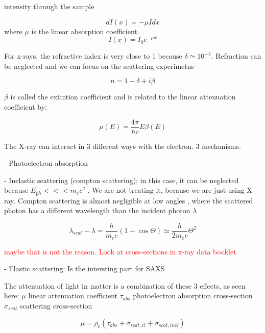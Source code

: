 intensity through the sample

\begin{equation}
        dI\left( x \right)=-\mu I dx
\end{equation}
where $\mu$ is the linear absorption coefficient.
\begin{equation}
        I\left( x \right)=I_0e^{-\mu x}
\end{equation}

For x-rays, the refractive index is very close to 1 because $\delta\simeq10^{-5}$. Refraction can be neglected and we can focus on the scattering experimetns

\begin{equation}
        n = 1 - \delta +i \beta
\end{equation}

$\beta$ is called the extintion coefficient and is related to the linear attenuation coefficient by:

\begin{equation}
        \mu (E) = \frac{4\pi}{hc} E \beta(E)
\end{equation}

The X-ray can interact in 3 different ways with the electron. 3 mechanisms.

- Photoelectron absorption

- Inelastic scattering (compton scattering): in this case, it can be neglected because $E_{ph}<<< m_ec^2$ . We are not treating it, because we are just using X-ray. Compton scattering is almost negligible at low angles , where the scattered photon has a different wavelength than the incident photon $\lambda$

\begin{equation}
        \lambda_{scat}-\lambda = \frac{h}{m_e c}\left( 1 - \cos{\Theta} \right) \simeq \frac{h}{2m_e c} \Theta ^ 2
\end{equation}

\textcolor{red}{maybe that is not the reason. Look at cross-sections in x-ray data booklet}

- Elastic scattering: Is the intersting part for SAXS

The attenuation of light in matter is a combination of these 3 effects, as seen here: $\mu$ linear attenuation coefficient $\tau_{abs}$ photoelectron absorption cross-section $\sigma_{scat}$ scattering cross-section

\begin{equation}
        \mu = \rho_e (\tau_{abs}+\sigma_{scat, el}+\sigma_{scat, inel})
\end{equation}


